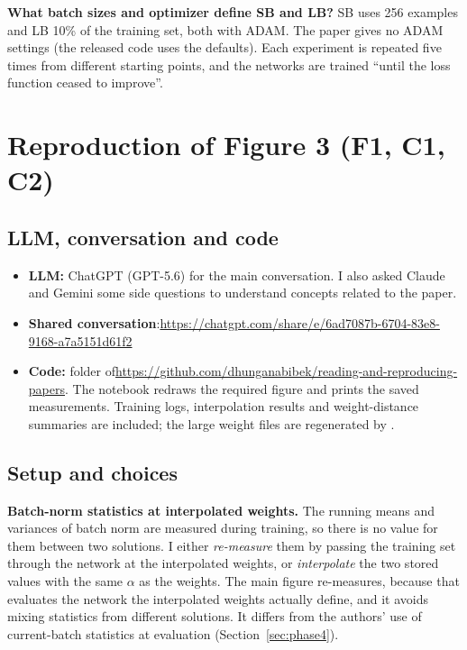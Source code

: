 \textbf{What batch sizes and optimizer define SB and LB?} SB uses 256 examples and LB 10\% of the training set, both with ADAM. The paper gives no ADAM settings (the released code uses the defaults). Each experiment is repeated five times from different starting points, and the networks are trained ``until the loss function ceased to improve''.

\section{Reproduction of Figure 3 (F1, C1, C2)}

\subsection{LLM, conversation and code}
\begin{itemize}
  \item \textbf{LLM:} ChatGPT (GPT-5.6) for the main conversation. I also asked Claude and Gemini some side questions to understand concepts related to the paper.
  \item \textbf{Shared conversation}:\newline \url{https://chatgpt.com/share/e/6ad7087b-6704-83e8-9168-a7a5151d61f2}
  \item \textbf{Code:} folder  of\newline \url{https://github.com/dhunganabibek/reading-and-reproducing-papers}. The notebook  redraws the required figure and prints the saved measurements. Training logs, interpolation results and weight-distance summaries are included; the large weight files are regenerated by .
\end{itemize}

\subsection{Setup and choices}

\textbf{Batch-norm statistics at interpolated weights.} The running means and variances of batch norm are measured during training, so there is no value for them between two solutions. I either \emph{re-measure} them by passing the training set through the network at the interpolated weights, or \emph{interpolate} the two stored values with the same $\alpha$ as the weights. The main figure re-measures, because that evaluates the network the interpolated weights actually define, and it avoids mixing statistics from different solutions. It differs from the authors' use of current-batch statistics at evaluation (Section~\ref{sec:phase4}).


